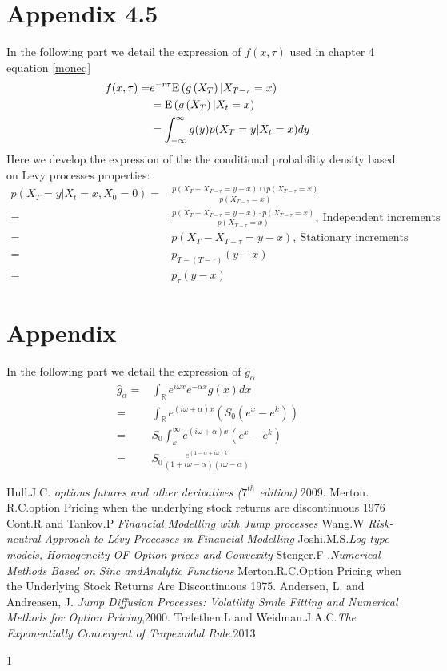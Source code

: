 \documentclass[12pt]{report}
\begin{document}
\section{Appendix 4.5} \label{App:AppendixA}
In the following part we detail the expression of $f(x,\tau)$ used in chapter 4 equation \eqref{moneq}
\begin{align*}
f(x,\tau)=& e^{-r\tau}\mathrm{E} \left( {{g \left( {X_T} \right)|X_{T-\tau} = x}} \right)\\
&=\mathrm{E} \left( {{g \left( {X_T} \right)|X_{t} = x}} \right)\\
&=\int_{-\infty}^{\infty}g(y)p(X_T =y|X_t = x) dy 
\end{align*}
Here we develop the expression of the the conditional probability density based on Levy processes properties:
\begin{align*}
p(X_T =y|X_t = x,X_0=0)=&\frac{p(X_T-X_{T-\tau}=y-x)\cap p(X_{T-\tau}=x)}{ p(X_{T-\tau}=x)}\\
=&\frac{p(X_T-X_{T-\tau}=y-x) \cdot p(X_{T-\tau}=x)}{ p(X_{T-\tau}=x)},~ \text{Independent increments}\\
=&p(X_T-X_{T-\tau}=y-x),~ \text{Stationary increments}\\
=&p_{T-(T-\tau)}(y-x)\\
=&p_{\tau}(y-x)
\end{align*}
\section{Appendix } \label{App:AppendixB}
In the following part we detail the expression of $\hat{g}_{\alpha}$
\begin{align*}
\hat{g}_{\alpha}=&\int_{\mathbb{R}} e^{i\omega x}e^{-\alpha x}g(x)dx\\
=&\int_{\mathbb{R}} e^{(i\omega+\alpha) x}(S_0(e^x-e^k))\\
=& S_0 \int_{k}^{\infty} e^{(i\omega+\alpha) x}(e^{x}-e^{k})\\
=& S_0 \frac{e^{(1-\alpha+i\omega)k}}{(1+i\omega-\alpha)(i \omega-\alpha)}
\end{align*}

\newpage

 \begin{thebibliography}{1}
   Hull.J.C. {\em options futures and other derivatives ($7^{th}$ edition)}  2009.
Merton. R.C.{option Pricing when the underlying stock returns are discontinuous} 1976
Cont.R and Tankov.P {\em Financial Modelling with Jump processes}
 Wang.W {\em Risk-neutral Approach to
Lévy Processes in Financial Modelling}
 Joshi.M.S.{\em Log-type models, Homogeneity OF Option prices and Convexity}
 Stenger.F .{\em Numerical Methods
Based on Sinc andAnalytic Functions}
 Merton.R.C.{Option Pricing when the Underlying Stock Returns Are Discontinuous} 1975.
  Andersen, L. and Andreasen, J. {\em Jump Diffusion Processes: Volatility Smile Fitting
and Numerical Methods for Option Pricing},2000.
 Trefethen.L and Weidman.J.A.C.{\em The Exponentially  Convergent  of Trapezoidal  Rule}.2013
\end{thebibliography}{1}
 
\end{document}
